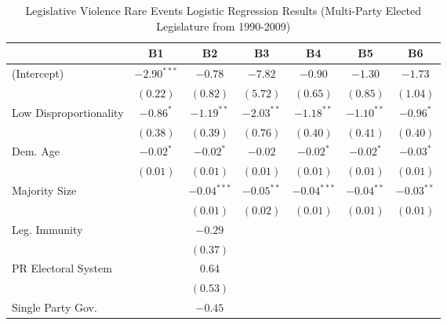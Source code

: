 \documentclass[a4paper]{article}\usepackage[]{graphicx}\usepackage[]{color}
\begin{document}
\begin{table}
\caption{Legislative Violence Rare Events Logistic Regression Results (Multi-Party Elected Legislature from 1990-2009)}
\label{outputTable.1990}
\begin{center}

\begin{tabular}{l c c c c c c }
\hline
                        & B1 & B2 & B3 & B4 & B5 & B6 \\
\hline
(Intercept)             & $-2.90^{***}$ & $-0.78$       & $-7.82$      & $-0.90$       & $-1.30$      & $-1.73$      \\
                        & $(0.22)$      & $(0.82)$      & $(5.72)$     & $(0.65)$      & $(0.85)$     & $(1.04)$     \\
Low Disproportionality  & $-0.86^{*}$   & $-1.19^{**}$  & $-2.03^{**}$ & $-1.18^{**}$  & $-1.10^{**}$ & $-0.96^{*}$  \\
                        & $(0.38)$      & $(0.39)$      & $(0.76)$     & $(0.40)$      & $(0.41)$     & $(0.40)$     \\
Dem. Age                & $-0.02^{*}$   & $-0.02^{*}$   & $-0.02$      & $-0.02^{*}$   & $-0.02^{*}$  & $-0.03^{*}$  \\
                        & $(0.01)$      & $(0.01)$      & $(0.01)$     & $(0.01)$      & $(0.01)$     & $(0.01)$     \\
Majority Size           &               & $-0.04^{***}$ & $-0.05^{**}$ & $-0.04^{***}$ & $-0.04^{**}$ & $-0.03^{**}$ \\
                        &               & $(0.01)$      & $(0.02)$     & $(0.01)$      & $(0.01)$     & $(0.01)$     \\
Leg. Immunity           &               & $-0.29$       &              &               &              &              \\
                        &               & $(0.37)$      &              &               &              &              \\
PR Electoral System     &               & $0.64$        &              &               &              &              \\
                        &               & $(0.53)$      &              &               &              &              \\
Single Party Gov.       &               & $-0.45$       &              &               &              &              \\

\end{tabular}
\end{center}
\end{table}
\end{document}
